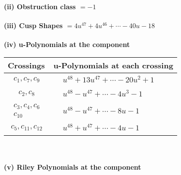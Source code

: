 \documentclass[1p]{elsarticle_modified}
\theoremstyle{definition}
\begin{document}
\flushleft \textbf{(ii) Obstruction class $= -1$}\\~\\
\flushleft \textbf{(iii) Cusp Shapes $= 4 u^{47}+4 u^{46}+\cdots-40 u-18$}\\~\\
\newpage\renewcommand{\arraystretch}{1}
\flushleft \textbf{(iv) u-Polynomials at the component}\newline \\
\begin{tabular}{m{50pt}|m{274pt}}
Crossings & \hspace{64pt}u-Polynomials at each crossing \\
\hline $$\begin{aligned}c_{1},c_{7},c_{9}\end{aligned}$$&$\begin{aligned}
&u^{48}+13 u^{47}+\cdots-20 u^2+1
\end{aligned}$\\
\hline $$\begin{aligned}c_{2},c_{8}\end{aligned}$$&$\begin{aligned}
&u^{48}- u^{47}+\cdots-4 u^3-1
\end{aligned}$\\
\hline $$\begin{aligned}c_{3},c_{4},c_{6}\\c_{10}\end{aligned}$$&$\begin{aligned}
&u^{48}- u^{47}+\cdots-8 u-1
\end{aligned}$\\
\hline $$\begin{aligned}c_{5},c_{11},c_{12}\end{aligned}$$&$\begin{aligned}
&u^{48}+u^{47}+\cdots-4 u-1
\end{aligned}$\\
\hline
\end{tabular}\\~\\
\newpage\renewcommand{\arraystretch}{1}
\flushleft \textbf{(v) Riley Polynomials at the component}\newline \\
\end{document}
